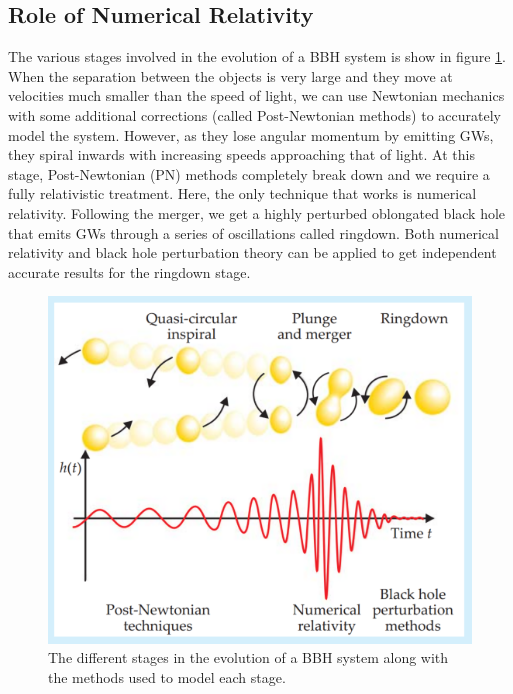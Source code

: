 \documentclass[aps,twocolumn,secnumarabic,nobalancelastpage,amsmath,amssymb,
nofootinbib]{revtex4}
\begin{document}
	\subsection{Role of Numerical Relativity}
	
	The various stages involved in the evolution of a BBH system is show in figure \ref{stages}. When the separation between the objects is very large and they move at velocities much smaller than the speed of light, we can use Newtonian mechanics with some additional corrections (called Post-Newtonian methods) to accurately model the system. However, as they lose angular momentum by emitting GWs, they spiral inwards with increasing speeds approaching that of light. At this stage, Post-Newtonian (PN) methods completely break down and we require a fully relativistic treatment. Here, the only technique that works is numerical relativity. Following the merger, we get a highly perturbed oblongated black hole that emits GWs through a series of oscillations called ringdown. Both numerical relativity and black hole perturbation theory can be applied to get independent accurate results for the ringdown stage.
	\newline

		\begin{figure}[h]
			\includegraphics[width=\linewidth]{stages.png}
			\caption{The different stages in the evolution of a BBH system along with the methods used to model each stage. \cite{bbhm} }
			\label{stages}
		\end{figure}
		
\end{document}
